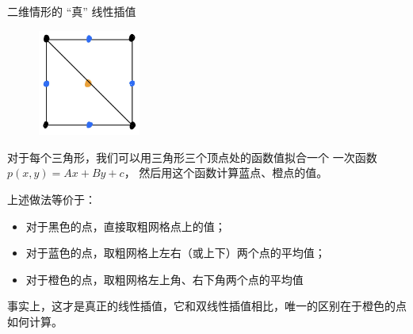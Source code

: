 \documentclass[9pt]{beamer}
\begin{document}
\begin{frame}{二维情形的 “真” 线性插值}
  \small
 \begin{figure}[H]
  \centering
  \includegraphics[width=0.3\textwidth]{pic/linear.jpg}
\end{figure}

对于每个三角形，我们可以用三角形三个顶点处的函数值拟合一个
一次函数 $p(x,y)=Ax+By+c$，
然后用这个函数计算蓝点、橙点的值。

\vspace{1em}\pause

上述做法等价于：
\begin{itemize}
	\item 对于黑色的点，直接取粗网格点上的值；
	\item 对于蓝色的点，取粗网格上左右（或上下）两个点的平均值；
	\item 对于橙色的点，取粗网格左上角、右下角两个点的平均值
\end{itemize}

事实上，这才是真正的线性插值，它和双线性插值相比，唯一的区别在于橙色的点如何计算。
\end{frame}
\end{document}
